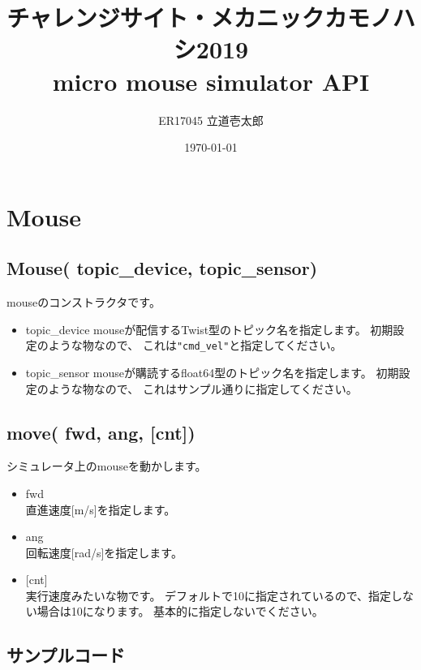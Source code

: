 \documentclass[11pt,a4paper]{jsarticle}
\title{チャレンジサイト・メカニックカモノハシ2019\\ micro mouse simulator API}
\author{ER17045 立道壱太郎}
\date{\today}
\begin{document}
\maketitle
%
%
\section*{Mouse}
\subsection*{Mouse( topic\_device, topic\_sensor)}
mouseのコンストラクタです。

\begin{itemize}
\item{topic\_device  }
mouseが配信するTwist型のトピック名を指定します。
初期設定のような物なので、
これは\verb|"cmd_vel"|と指定してください。

\item{topic\_sensor  }
mouseが購読するfloat64型のトピック名を指定します。
初期設定のような物なので、
これはサンプル通りに指定してください。
\end{itemize}


\subsection*{move( fwd, ang, [cnt])}
シミュレータ上のmouseを動かします。

\begin{itemize}
\item{fwd}\\
直進速度[m/s]を指定します。

\item{ang}\\
回転速度[rad/s]を指定します。

\item{[cnt]}\\
実行速度みたいな物です。
デフォルトで10に指定されているので、指定しない場合は10になります。
基本的に指定しないでください。
\end{itemize}


\subsection*{サンプルコード}





\newpage
\end{document}

